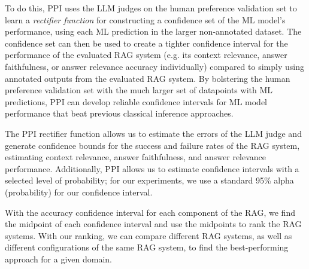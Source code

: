 To do this, PPI uses the LLM judges on the human preference validation set to learn a \textit{rectifier function} for constructing a confidence set of the ML model's performance, using each ML prediction in the larger non-annotated dataset. 
The confidence set can then be used to create a tighter confidence interval for the performance of the evaluated RAG system (e.g. its context relevance, answer faithfulness, or answer relevance accuracy individually) compared to simply using annotated outputs from the evaluated RAG system.
By bolstering the human preference validation set with the much larger set of datapoints with ML predictions, PPI can develop reliable confidence intervals for ML model performance that beat previous classical inference approaches.

The PPI rectifier function allows us to estimate the errors of the LLM judge and generate confidence bounds for the success and failure rates of the RAG system, estimating context relevance, answer faithfulness, and answer relevance performance.
Additionally, PPI allows us to estimate confidence intervals with a selected level of probability; for our experiments, we use a standard 95\% alpha (probability) for our confidence interval.

With the accuracy confidence interval for each component of the RAG, we find the midpoint of each confidence interval and use the midpoints to rank the RAG systems.
With our ranking, we can compare different RAG systems, as well as different configurations of the same RAG system, to find the best-performing approach for a given domain.
